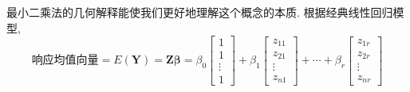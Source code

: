 
最小二乘法的几何解释能使我们更好地理解这个概念的本质. 根据经典线性回归模型,
\[
\text{响应均值向量}=E(\mathbf{Y})=\mathbf{Z}\boldsymbol{\beta}
=\beta_0\begin{bmatrix}1\\1\\\vdots\\1\end{bmatrix}
+\beta_1\begin{bmatrix}z_{11}\\z_{21}\\\vdots\\z_{n1}\end{bmatrix}
+\cdots+\beta_r\begin{bmatrix}z_{1r}\\z_{2r}\\\vdots\\z_{nr}\end{bmatrix}
\]
